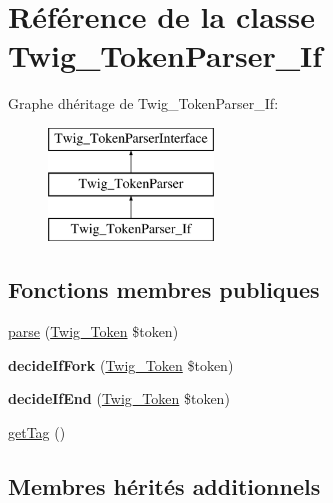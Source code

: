 \hypertarget{class_twig___token_parser___if}{}\section{Référence de la classe Twig\+\_\+\+Token\+Parser\+\_\+\+If}
\label{class_twig___token_parser___if}
Graphe d\textquotesingle{}héritage de Twig\+\_\+\+Token\+Parser\+\_\+\+If\+:\begin{figure}[H]
\begin{center}
\leavevmode
\includegraphics[height=3.000000cm]{class_twig___token_parser___if}
\end{center}
\end{figure}
\subsection*{Fonctions membres publiques}
\begin{DoxyCompactItemize}
\item 
\hyperlink{class_twig___token_parser___if_a5dfa2e269321584fb74e8b43dabe0efd}{parse} (\hyperlink{class_twig___token}{Twig\+\_\+\+Token} \$token)
\item 
{\bfseries decide\+If\+Fork} (\hyperlink{class_twig___token}{Twig\+\_\+\+Token} \$token)\hypertarget{class_twig___token_parser___if_a36fbfdd07a5a5ad35606f1cf9b9375c6}{}\label{class_twig___token_parser___if_a36fbfdd07a5a5ad35606f1cf9b9375c6}

\item 
{\bfseries decide\+If\+End} (\hyperlink{class_twig___token}{Twig\+\_\+\+Token} \$token)\hypertarget{class_twig___token_parser___if_a7b1dcebce78e66f752376f9e39b3b2a8}{}\label{class_twig___token_parser___if_a7b1dcebce78e66f752376f9e39b3b2a8}

\item 
\hyperlink{class_twig___token_parser___if_ab86ba36154b20e6bbfa3ba705f12f9d6}{get\+Tag} ()
\end{DoxyCompactItemize}
\subsection*{Membres hérités additionnels}


